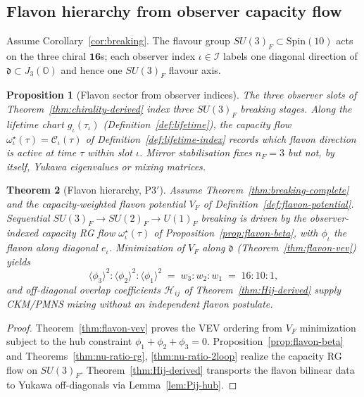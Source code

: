 \documentclass[aps,prd,onecolumn,amsmath,amssymb,nofootinbib,11pt]{revtex4-2}
\numberwithin{equation}{section}
\theoremstyle{plain}
\newtheorem{theorem}{Theorem}[section]
\newtheorem{proposition}[theorem]{Proposition}
\theoremstyle{definition}
\theoremstyle{remark}
\newcommand{\jalg}{J_3(\mathbb{O})}
\newcommand{\Spin}{\mathrm{Spin}}
\newcommand{\capacity}{\mathcal{C}}
\begin{document}
\subsection{Flavon hierarchy from observer capacity flow}
\label{sec:physics:flavon}

Assume Corollary~\ref{cor:breaking}. The flavour group
$SU(3)_F\subset\Spin(10)$ acts on the three chiral $\mathbf{16}$s; each
observer index $\iota\in\mathcal{I}$ labels one diagonal direction of
$\mathfrak{d}\subset\jalg$ and hence one $SU(3)_F$ flavour axis.

\begin{proposition}[Flavon sector from observer indices]\label{prop:flavon-sector}
The three observer slots of Theorem~\ref{thm:chirality-derived} index three
$SU(3)_F$ breaking stages. Along the lifetime chart $g_\iota(\tau_\iota)$
(Definition~\ref{def:lifetime}), the capacity flow
$\omega^\star_\iota(\tau)=\capacity_\iota(\tau)$ of
Definition~\ref{def:lifetime-index} records which flavon direction is active at
time $\tau$ within slot $\iota$. Mirror stabilisation fixes $n_F=3$ but not,
by itself, Yukawa eigenvalues or mixing matrices.
\end{proposition}

\begin{theorem}[Flavon hierarchy, P3$'$]\label{thm:flavon-hierarchy}
Assume Theorem~\ref{thm:breaking-complete} and the capacity-weighted flavon
potential $V_F$ of Definition~\ref{def:flavon-potential}. Sequential
$SU(3)_F\to SU(2)_F\to U(1)_F$ breaking is driven by the observer-indexed
capacity RG flow $\omega^\star_\iota(\tau)$ of
Proposition~\ref{prop:flavon-beta}, with $\phi_\iota$ the flavon along
diagonal $e_\iota$. Minimization of $V_F$ along $\mathfrak{d}$
(Theorem~\ref{thm:flavon-vev}) yields
\begin{equation}\label{eq:flavon-hierarchy-vev}
  \langle\phi_3\rangle^2 : \langle\phi_2\rangle^2 : \langle\phi_1\rangle^2
  \;=\;
  w_3 : w_2 : w_1
  \;=\;
  16 : 10 : 1,
\end{equation}
and off-diagonal overlap coefficients $\mathcal{H}_{ij}$ of
Theorem~\ref{thm:Hij-derived} supply CKM/PMNS mixing without an independent
flavon postulate.
\end{theorem}

\begin{proof}
Theorem~\ref{thm:flavon-vev} proves the VEV ordering from $V_F$ minimization
subject to the hub constraint $\phi_1+\phi_2+\phi_3=0$.
Proposition~\ref{prop:flavon-beta} and Theorems~\ref{thm:nu-ratio-rg},
\ref{thm:nu-ratio-2loop} realize the capacity RG flow on $SU(3)_F$.
Theorem~\ref{thm:Hij-derived} transports the flavon bilinear data to Yukawa
off-diagonals via Lemma~\ref{lem:Pij-hub}.
\end{proof}%
\end{document}
